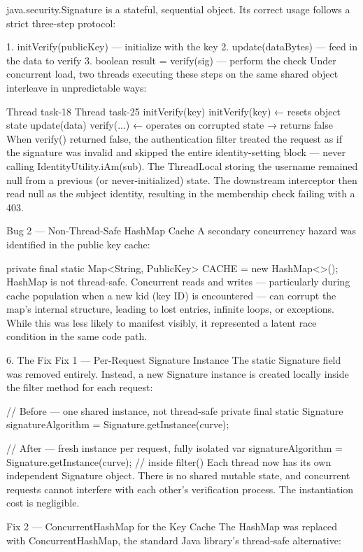 java.security.Signature is a stateful, sequential object. Its correct usage follows a strict three-step protocol:


1. initVerify(publicKey)          — initialize with the key
2. update(dataBytes)              — feed in the data to verify
3. boolean result = verify(sig)   — perform the check
Under concurrent load, two threads executing these steps on the same shared object interleave in unpredictable ways:

Thread task-18	Thread task-25
initVerify(key)	
initVerify(key) ← resets object state
update(data)	
verify(...) ← operates on corrupted state → returns false	
When verify() returned false, the authentication filter treated the request as if the signature was invalid and skipped the entire identity-setting block — never calling IdentityUtility.iAm(sub). The ThreadLocal storing the username remained null from a previous (or never-initialized) state. The downstream interceptor then read null as the subject identity, resulting in the membership check failing with a 403.

Bug 2 — Non-Thread-Safe HashMap Cache
A secondary concurrency hazard was identified in the public key cache:


private final static Map<String, PublicKey> CACHE = new HashMap<>();
HashMap is not thread-safe. Concurrent reads and writes — particularly during cache population when a new kid (key ID) is encountered — can corrupt the map's internal structure, leading to lost entries, infinite loops, or exceptions. While this was less likely to manifest visibly, it represented a latent race condition in the same code path.

6. The Fix
Fix 1 — Per-Request Signature Instance
The static Signature field was removed entirely. Instead, a new Signature instance is created locally inside the filter method for each request:


// Before — one shared instance, not thread-safe
private final static Signature signatureAlgorithm = Signature.getInstance(curve);

// After — fresh instance per request, fully isolated
var signatureAlgorithm = Signature.getInstance(curve); // inside filter()
Each thread now has its own independent Signature object. There is no shared mutable state, and concurrent requests cannot interfere with each other's verification process. The instantiation cost is negligible.

Fix 2 — ConcurrentHashMap for the Key Cache
The HashMap was replaced with ConcurrentHashMap, the standard Java library's thread-safe alternative:


